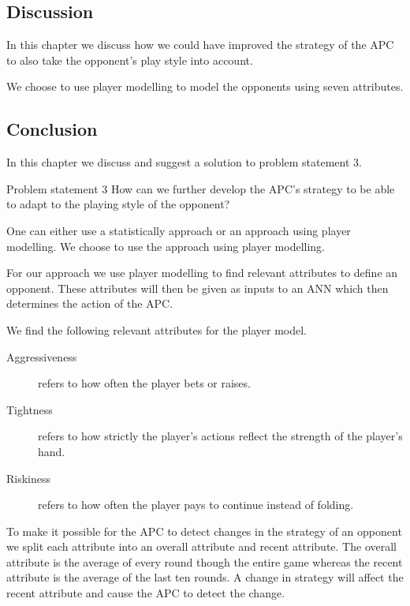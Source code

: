 \subsection{Discussion}
In this chapter we discuss how we could have improved the strategy of the APC to also take the opponent's play style into account. 

We choose to use player modelling to model the opponents using seven attributes. 


\subsection{Conclusion}
In this chapter we discuss and suggest a solution to problem statement 3.

\vspace{4mm}
\begin{statementBox2}{Problem statement 3}
How can we further develop the APC's strategy to be able to adapt to the playing style of the opponent?
\end{statementBox2}
\vspace{4mm} 

One can either use a statistically approach or an approach using player modelling. We choose to use the approach using player modelling. 

For our approach we use player modelling to find relevant attributes to define an opponent. These attributes will then be given as inputs to an ANN which then determines the action of the APC. 

We find the following relevant attributes for the player model.

\begin{description}
\item[Aggressiveness] refers to how often the player bets or raises.
\item[Tightness] refers to how strictly the player's actions reflect the strength of the player's hand.
\item[Riskiness] refers to how often the player pays to continue instead of folding.
\end{description}

To make it possible for the APC to detect changes in the strategy of an opponent we split each attribute into an overall attribute and recent attribute. The overall attribute is the average of every round though the entire game whereas the recent attribute is the average of the last ten rounds. A change in strategy will affect the recent attribute and cause the APC to detect the change.

